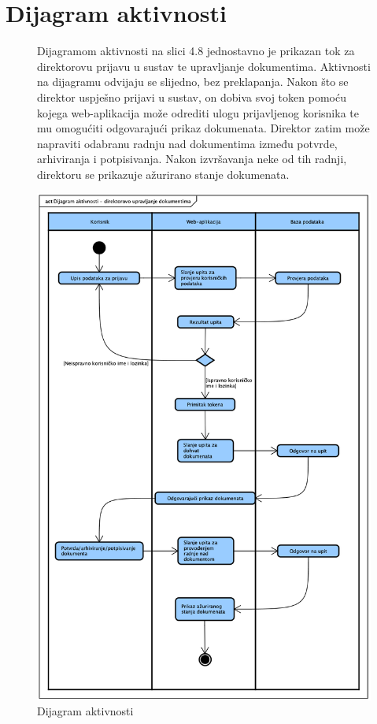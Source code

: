 		\section{Dijagram aktivnosti}
			\begin{figure}[H]
			Dijagramom aktivnosti na slici 4.8 jednostavno je prikazan tok za direktorovu prijavu u sustav te upravljanje dokumentima. Aktivnosti na dijagramu
			odvijaju se slijedno, bez preklapanja. Nakon što se direktor uspješno prijavi u sustav, on dobiva svoj token pomoću kojega web-aplikacija može odrediti
			ulogu prijavljenog korisnika te mu omogućiti odgovarajući prikaz dokumenata. Direktor zatim može napraviti odabranu radnju nad dokumentima između potvrde,
			arhiviranja i potpisivanja. Nakon izvršavanja neke od tih radnji, direktoru se prikazuje ažurirano stanje dokumenata.
			\end{figure}
			\begin{figure}[H]
				\centering
				\includegraphics[scale=0.5]{slike/Activity.png}
				\caption{Dijagram aktivnosti}
				\label{fig:Activity}
			\end{figure}
			
